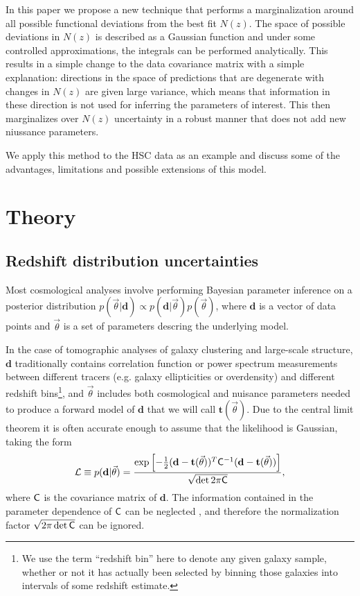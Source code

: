 \documentclass[a4paper,11pt]{article}
\newcommand{\vd}{\mathbf{d}}
\newcommand{\vt}{\mathbf{t}}
\begin{document}
    In this paper we propose a new technique that performs a marginalization around all possible functional deviations from the best fit $N(z)$. The space of possible deviations in $N(z)$ is described as a Gaussian function and under some controlled approximations, the integrals can be performed analytically. This results in a simple change to the data covariance matrix with a simple explanation: directions in the space of predictions that are degenerate with changes in $N(z)$ are given large variance, which means that information in these direction is not used for inferring the parameters of interest. This then marginalizes over $N(z)$ uncertainty in a robust manner that does not add new niussance parameters.

    We apply this method to the HSC data as an example and  discuss some of the advantages, limitations and possible extensions of this model. 

  \section{Theory}\label{sec:theory}
    \subsection{Redshift distribution uncertainties}\label{ssec:theory.nz}
      Most cosmological analyses involve performing Bayesian parameter inference on a posterior distribution $p(\vec{\theta} |\vd) \propto p(\vd|\vec{\theta}) p(\vec{\theta})$, where $\vd$ is a vector of data points and $\vec{\theta}$ is a set of parameters descring the underlying model.
      
      In the case of tomographic analyses of galaxy clustering and large-scale structure, $\vd$ traditionally contains correlation function or power spectrum measurements between different tracers (e.g. galaxy ellipticities or overdensity) and different redshift bins\footnote{We use the term ``redshift bin'' here to denote any given galaxy sample, whether or not it has actually been selected by binning those galaxies into intervals of some redshift estimate.}, and $\vec{\theta}$ includes both cosmological and nuisance parameters needed to produce a forward model of $\vd$ that we will call $\vt(\vec{\theta})$. Due to the central limit theorem it is often accurate enough to assume that the likelihood is Gaussian, taking the form
      \begin{equation}
        \mathcal{L} \equiv p({\bf d}|\vec{\theta}) = \frac{\exp\left [-\frac{1}{2}(\vd-\vt(\vec{\theta}))^T{\sf C}^{-1}(\vd-\vt(\vec{\theta})) \right]}{\sqrt{\det{2\pi{\sf C}}}}, \label{eq:like}
     \end{equation}
      where ${\sf C}$ is the covariance matrix of $\vd$. The information contained in the parameter dependence of ${\sf C}$ can be neglected \citep{1811.11584}, and therefore the normalization factor $\sqrt{2\pi\det{\sf C}}$ can be ignored.
\end{document}
